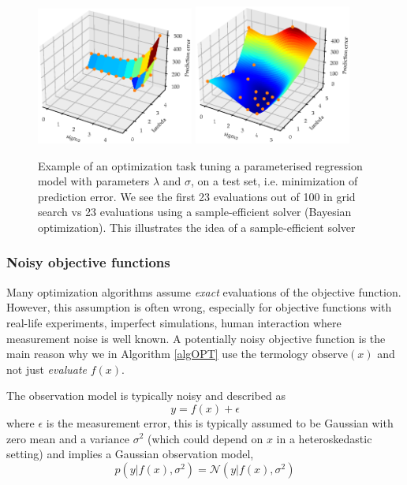\begin{figure}[H]%
    \centering
    {\includegraphics[width=0.46\textwidth]{Pictures/BO_vs_Grid2.eps} }%
    \qquad
   {\includegraphics[width=0.46\textwidth]{Pictures/BO_vs_Grid1.eps} }%
    \caption{Example of an optimization task tuning a parameterised regression model with parameters
    $\lambda$ and $\sigma$, on a test set, i.e. minimization of prediction error. We see the first
    23 evaluations out of 100 in grid search vs 23 evaluations using a sample-efficient solver (Bayesian
    optimization). This illustrates the idea of a sample-efficient solver}%
    \label{fig:example}%
\end{figure}


\subsubsection{Noisy objective functions}
Many optimization algorithms assume \textit{exact} evaluations of the objective function. However,
this assumption is often wrong, especially for objective functions with real-life experiments,
imperfect simulations, human interaction where measurement noise is well known. A potentially noisy
objective function is the main reason why we in Algorithm \eqref{algOPT} use the termology
$\text{observe}(x)$ and not just \textit{evaluate }$f(x)$.

The observation model is typically noisy and described as
$$y = f(x)+\epsilon$$ where $\epsilon$ is the measurement error, this is
typically assumed to be Gaussian with zero mean and a variance
$\sigma^2$ (which could depend on $x$ in a heteroskedastic setting) and implies a Gaussian observation model, 
$$p(y|f(x),\sigma^2) = \mathcal{N}(y|f(x),\sigma^2)$$ 

